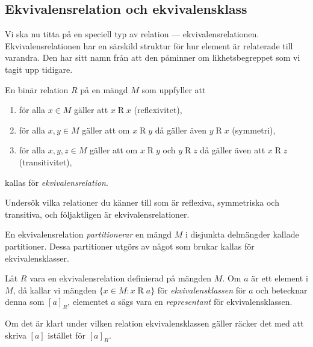 \subsection{Ekvivalensrelation och ekvivalensklass}
Vi ska nu titta på en speciell typ av relation --- ekvivalensrelationen.
Ekvivalensrelationen har en särskild struktur för hur element är relaterade
till varandra.
Den har sitt namn från att den påminner om likhetsbegreppet som vi tagit upp
tidigare.

\begin{definition}\label{def:Ekvivalensrelation}
  En binär relation \(R\) på en mängd \(M\) som uppfyller att
  \begin{enumerate}
    \item för alla \(x\in M\) gäller att \(x\mathop R x\) (reflexivitet),
    \item för alla \(x,y\in M\) gäller att om \(x\mathop R y\) då gäller även
      \(y\mathop R x\) (symmetri),
    \item för alla \(x,y,z\in M\) gäller att om \(x\mathop R y\) och \(y\mathop 
      R z\)
      då gäller även att \(x\mathop R z\) (transitivitet),
  \end{enumerate}
  kallas för \emph{ekvivalensrelation}.
\end{definition}
\begin{exercise}
  Undersök vilka relationer du känner till som är reflexiva, symmetriska och
  transitiva, och följaktligen är ekvivalensrelationer.
\end{exercise}

En ekvivalensrelation \emph{partitionerar} en mängd \(M\) i disjunkta
delmängder kallade partitioner.
Dessa partitioner utgörs av något som brukar
kallas för ekvivalensklasser. %
\begin{definition}\label{def:Ekvivalensklass}
  Låt \(R\) vara en ekvivalensrelation definierad på mängden \(M\).
  Om \(a\) är ett element i \(M\), då kallar vi mängden
  \(\{x\in M\colon x\mathop R a\}\) för \emph{ekvivalensklassen} för \(a\) och 
  betecknar denna som \([a]_R\), elementet \(a\) sägs vara en 
  \emph{representant} för ekvivalensklassen.
\end{definition}
Om det är klart under vilken relation ekvivalensklassen gäller räcker det med
att skriva \([a]\) istället för \([a]_R\).

